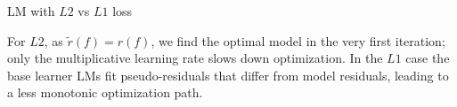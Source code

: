 \begin{frame}{LM with $L2$ vs $L1$ loss}

\vfill

\footnotesize
For $L2$, as $\tilde r(f) = r(f)$, we find the optimal model in the very
first iteration; only the multiplicative learning rate slows down optimization.
In the $L1$ case the base learner LMs fit pseudo-residuals that differ from 
model residuals, leading to a less monotonic optimization path.

\end{frame}
% 
% 
% 
% 
% 
% 
% 
% 
% 
% 
% 
% 
% 

